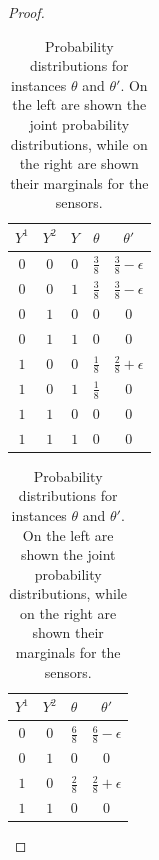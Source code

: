 \documentclass[11pt]{article} %
\begin{document}
\begin{proof}
\bgroup
\def\arraystretch{1.5}
\begin{table}[]
	\centering
	\begin{tabular}{|c|c|c||c|c|}
		\hline
		$Y^1$ & $Y^2$ & $Y$ & $\theta$ & $\theta'$ \\ \hline\hline
		$0$ & $0$ & $0$ & $\frac38$ & $\frac38-\epsilon$ \\ \hline
		$0$ & $0$ & $1$ & $\frac38$ & $\frac38-\epsilon$ \\ \hline
		$0$ & $1$ & $0$ & $0         $ & $0                       $ \\ \hline
		$0$ & $1$ & $1$ & $0         $ & $0                       $ \\ \hline
		$1$ & $0$ & $0$ & $\frac18$ & $\frac28+\epsilon$ \\ \hline
		$1$ & $0$ & $1$ & $\frac18$ & $0                       $ \\ \hline
		$1$ & $1$ & $0$ & $0         $ & $0                       $ \\ \hline
		$1$ & $1$ & $1$ & $0         $ & $0                       $ \\ \hline
	\end{tabular}
	\mbox{}
	\vspace*{2in}
	\hspace*{0.5in}
	\mbox{}
	\begin{tabular}{|c|c||c|c|}
		\hline
		$Y^1$ & $Y^2$ &$\theta$ & $\theta'$ \\ \hline\hline
		$0$ & $0$ & $\frac68$ & $\frac68-\epsilon$ \\ \hline
		$0$ & $1$ & $0         $ & $0                       $ \\ \hline
		$1$ & $0$ & $\frac28$ & $\frac28+\epsilon$ \\ \hline
		$1$ & $1$ & $0         $ & $0                       $ \\ \hline
	\end{tabular}
	
	\vspace*{0.1in}
	\caption{Probability distributions for instances $\theta$ and $\theta'$. On the left are shown the joint
		probability distributions, while on the right are shown their marginals
		for the sensors.}
	\label{tab:nonunif3}
\end{table}
\egroup


\end{proof}
\end{document}
